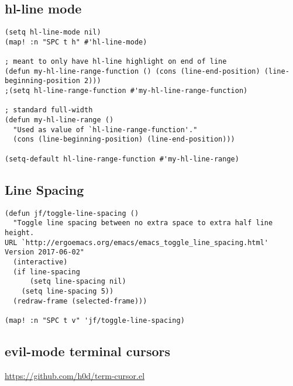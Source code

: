 \documentclass[8pt]{article}
\begin{document}
\subsection{hl-line mode}
\label{sec:org6d0ea77}
\begin{verbatim}
(setq hl-line-mode nil)
(map! :n "SPC t h" #'hl-line-mode)

; meant to only have hl-line highlight on end of line
(defun my-hl-line-range-function () (cons (line-end-position) (line-beginning-position 2)))
;(setq hl-line-range-function #'my-hl-line-range-function)

; standard full-width
(defun my-hl-line-range ()
  "Used as value of `hl-line-range-function'."
  (cons (line-beginning-position) (line-end-position)))

(setq-default hl-line-range-function #'my-hl-line-range)
\end{verbatim}

\subsection{Line Spacing}
\label{sec:org3511cef}
\begin{verbatim}
(defun jf/toggle-line-spacing ()
  "Toggle line spacing between no extra space to extra half line height.
URL `http://ergoemacs.org/emacs/emacs_toggle_line_spacing.html'
Version 2017-06-02"
  (interactive)
  (if line-spacing
      (setq line-spacing nil)
    (setq line-spacing 5))
  (redraw-frame (selected-frame)))

(map! :n "SPC t v" 'jf/toggle-line-spacing)
\end{verbatim}

\subsection{evil-mode terminal cursors}
\label{sec:orge77bdb3}
\url{https://github.com/h0d/term-cursor.el}
\end{document}
